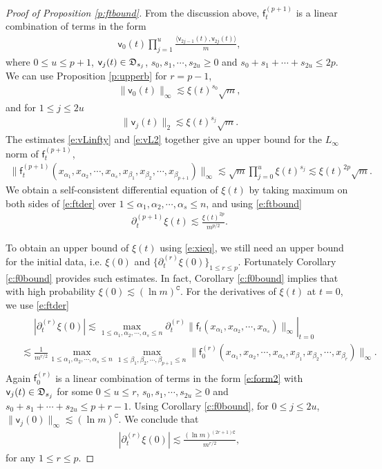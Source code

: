 \documentclass{article}
\numberwithin{equation}{section}
\newcommand{\fC}{{\mathtt C}}
\newcommand{\fD}{{\frak D}}
\newcommand{\sff}{{\mathsf f}}
\newcommand{\sfv}{{\mathsf v}}
\newcommand{\al}{\alpha}
\renewcommand{\leq}{\leqslant}
\renewcommand{\geq}{\geqslant}
\newcommand{\del}{\partial}
\newcommand{\1}{\mathds{1}}
\theoremstyle{plain} %
\begin{document}
\begin{proof}[Proof of Proposition \ref{p:ftbound}]
From the discussion above, $\sff_t^{(p+1)}$ is a linear combination of terms in the form
\begin{align}\label{e:form2}
\sfv_0(t)\prod_{j=1}^u \frac{\langle\sfv_{2j-1}(t),\sfv_{2j}(t)\rangle}{m},
\end{align}
where $0\leq u\leq p+1$, $\sfv_j(t)\in \fD_{s_j}$, $s_0, s_1,\cdots, s_{2u}\geq 0$ and $s_0+s_1+\cdots+s_{2u}\leq 2p$. We can use Proposition \ref{p:upperb} for $r=p-1$,
\begin{align}
\|\sfv_0(t)\|_\infty\lesssim \xi(t)^{s_0}\sqrt m,\label{e:vLinfty}
\end{align}
and for $1\leq j\leq 2u$
\begin{align}
\|\sfv_j(t)\|_2\lesssim \xi(t)^{s_j}\sqrt m.\label{e:vL2}
\end{align}
The estimates \eqref{e:vLinfty} and \eqref{e:vL2} together give an upper bound for the $L_\infty$ norm of $\sff_t^{(p+1)}$,
\begin{align}\label{e:ftbound}
\|\sff_t^{(p+1)}(x_{\al_1}, x_{\al_2}, \cdots, x_{\al_{s}}, x_{\beta_1}, x_{\beta_2},\cdots, x_{\beta_{p+1}})\|_\infty\lesssim 
\sqrt m \prod_{j=0}^{u}\xi(t)^{s_j}\lesssim  \xi(t)^{2p} \sqrt m.
\end{align}
We obtain a self-consistent differential equation of $\xi(t)$ by taking maximum on both sides of \eqref{e:ftder} over $1\leq \al_1,\al_2,\cdots,\al_s\leq n$, and using \eqref{e:ftbound}
\begin{align}\label{e:xieq}
\del^{(p+1)}_{t}\xi(t)\lesssim \frac{\xi(t)^{2p}}{m^{p/2}}.
\end{align}

To obtain an upper bound of $\xi(t)$ using \eqref{e:xieq}, we still need an upper bound for the initial data, i.e. $\xi(0)$ and $\{\del_t^{(r)}\xi(0)\}_{1\leq r\leq p}$. Fortunately Corollary \ref{c:f0bound} provides such estimates. In fact, Corollary \ref{c:f0bound} implies that with high probability $\xi(0)\lesssim (\ln m)^{\fC}$. For the derivatives of $\xi(t)$ at $t=0$, we use \eqref{e:ftder}
\begin{align*}\begin{split}
&\phantom{{}={}}|\del_t^{(r)} \xi(0)|
\lesssim 
\left.\max_{1\leq\al_1,\al_2,\cdots,\al_s\leq n}\del_t^{(r)}\|\sff_t(x_{\al_1}, x_{\al_2}, \cdots,x_{\al_{s}})\|_\infty \right|_{t=0} \\
&\lesssim 
\frac{1}{m^{r/2}}\max_{1\leq\al_1,\al_2,\cdots,\al_s\leq n}\max_{1\leq \beta_1,\beta_2,\cdots,\beta_{p+1} \leq n}\|\sff_0^{(r)}(x_{\al_1}, x_{\al_2}, \cdots, x_{\al_{s}}, x_{\beta_1}, x_{\beta_2},\cdots, x_{\beta_{r}})\|_\infty.
\end{split}\end{align*}
Again $\sff_0^{(r)}$ is a linear combination of terms in the form \eqref{e:form2} with $\sfv_j(t)\in \fD_{s_j}$ for some $0\leq u\leq r$, $s_0, s_1,\cdots, s_{2u}\geq 0$ and $s_0+s_1+\cdots+s_{2u}\leq p+r-1$. Using Corollary \ref{c:f0bound}, for $0\leq j\leq 2u$,  $\|\sfv_j(0)\|_\infty\lesssim (\ln m)^{\fC}$. We conclude that
\begin{align*}
|\del_t^{(r)} \xi(0)|
\lesssim \frac{(\ln m)^{(2r+1)\fC}}{m^{r/2}},
\end{align*}
for any $1\leq r\leq p$.


\end{proof}
\end{document}
